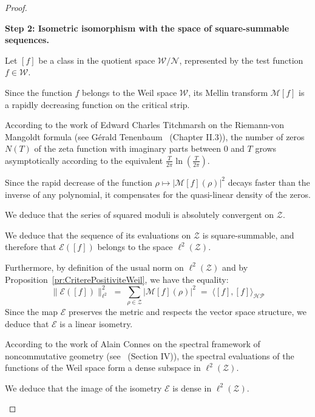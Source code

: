\documentclass[Riemann_Hypothesis.tex]{subfiles}
\begin{document}
\begin{proof}
    \begin{part_proof}
        \textbf{Step 2: Isometric isomorphism with the space of square-summable sequences.} \par
        Let $[f]$ be a class in the quotient space $\mathcal{W} / \mathcal{N}$, represented by the test function $f \in \mathcal{W}$. \par
        Since the function $f$ belongs to the Weil space $\mathcal{W}$, its Mellin transform $\mathcal{M}[f]$ is a rapidly decreasing function on the critical strip. \par
        According to the work of Edward Charles Titchmarsh on the 
        Riemann-von Mangoldt formula (see Gérald Tenenbaum~\cite{tenenbaum2015_intro_en} (Chapter II.3)), the number of zeros $N(T)$ of the zeta function with imaginary parts between $0$ and $T$ grows asymptotically according to the equivalent $\frac{T}{2\pi} \ln\left(\frac{T}{2\pi}\right)$. \par
        Since the rapid decrease of the function $\rho \mapsto |\mathcal{M}[f](\rho)|^2$ decays faster than the inverse of any polynomial, it compensates for the quasi-linear density of the zeros. \par
        We deduce that the series of squared moduli is absolutely convergent on $\mathcal{Z}$. \par
        We deduce that the sequence of its evaluations on $\mathcal{Z}$ is square-summable, and therefore that $\mathcal{E}([f])$ belongs to the space $\ell^2(\mathcal{Z})$. \par
        Furthermore, by definition of the usual norm on $\ell^2(\mathcal{Z})$ and by Proposition~\ref{pr:CriterePositiviteWeil}, we have the equality:
        \begin{equation*}
            \|\mathcal{E}([f])\|_{\ell^2}^2 \;=\; \sum_{\rho \in \mathcal{Z}} \left| \mathcal{M}[f](\rho) \right|^2 \;=\; \langle [f], [f] \rangle_{\mathcal{HP}}
        \end{equation*}
        Since the map $\mathcal{E}$ preserves the metric and respects the vector space structure, we deduce that $\mathcal{E}$ is a linear isometry. \par
        According to the work of Alain Connes on the spectral framework of noncommutative geometry (see~\cite{connes1999_trace_en} (Section IV)), 
        the spectral evaluations of the functions of the Weil space form a dense subspace in $\ell^2(\mathcal{Z})$. \par
        We deduce that the image of the isometry $\mathcal{E}$ is dense in $\ell^2(\mathcal{Z})$. \par

\end{part_proof}
\end{proof}
\end{document}
